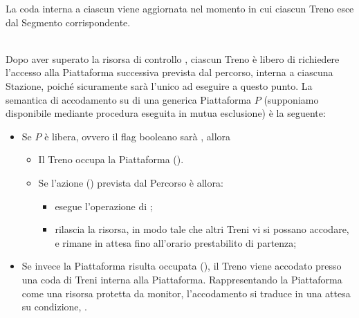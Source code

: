\begin{description}
		La coda interna a ciascun  viene aggiornata nel momento in cui ciascun Treno esce dal Segmento corrispondente. 
		
		\item{}\\
		
		Dopo aver superato la risorsa di controllo , ciascun Treno è libero di richiedere l'accesso alla Piattaforma successiva prevista dal percorso, interna a ciascuna Stazione, poiché sicuramente sarà l'unico ad eseguire a questo punto. La semantica di accodamento su di una generica Piattaforma $P$ (supponiamo disponibile mediante procedura eseguita in mutua esclusione) è la seguente:
		\begin{itemize}
			\item Se $P$ è libera, ovvero il flag booleano  sarà , allora 
				\begin{itemize}
					\item Il Treno occupa la Piattaforma ().
					\item Se l'azione () prevista dal Percorso è  allora:
						\begin{itemize}
							\item esegue l'operazione di ;
							\item rilascia la risorsa, in modo tale che altri Treni vi si possano accodare, e rimane in attesa fino all'orario prestabilito di partenza;
						\end{itemize}
				\end{itemize} 
			\item Se invece la Piattaforma risulta occupata (), il Treno viene accodato presso una coda di Treni interna alla Piattaforma. Rappresentando la Piattaforma come una risorsa protetta da monitor, l'accodamento si traduce in una attesa su condizione, .
		\end{itemize}
			

\end{description}
